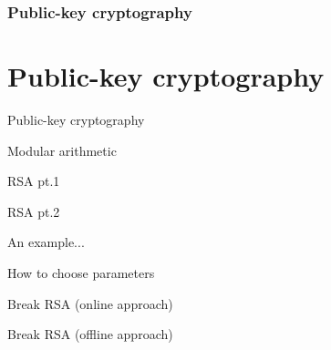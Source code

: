 \section{Public-key cryptography}
\part{Public-key cryptography}

\begin{frame}{Public-key cryptography}

\end{frame}

\begin{frame}{Modular arithmetic}

\end{frame}

\begin{frame}{RSA pt.1}

\end{frame}

\begin{frame}{RSA pt.2}

\end{frame}

\begin{frame}{An example...}

\end{frame}

\begin{frame}{How to choose parameters}

\end{frame}

\begin{frame}{Break RSA (online approach)}

\end{frame}

\begin{frame}{Break RSA (offline approach)}

\end{frame}

